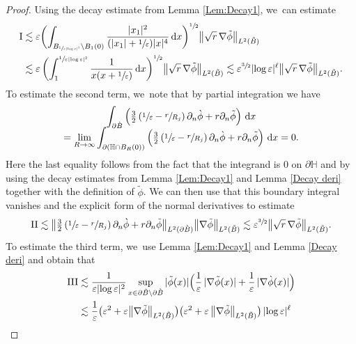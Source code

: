 \documentclass[10pt]{amsart}
\let\epsilon\varepsilon
\let\backslash\setminus
\newcommand{\rI}{\mathrm{I}}
\newcommand{\rII}{\mathrm{II}}
\newcommand{\rIII}{\mathrm{III}}
\theoremstyle{definition}
\newcommand\bnorm[1]{\bigl\lVert #1\bigr\rVert}
\newcommand\eq{=}
\newcommand\dd{\,\mathrm{d}}
\newcommand\dx{\dd x}
\let\de\partial
\let\eps\epsilon
\let\mel\relax
\begin{document}
\begin{proof}
Using the decay estimate from Lemma \ref{Lem:Decay1}, we~can estimate\vspace*{-3pt}
\begin{align*}
\mel \rI&\lesssim \eps\biggl(\int_{B_{\sfrac{1}{\eps|{\log\eps}|^2}}\backslash B_1(0)}\frac{|x_1|^2}{(|x_1|+\sfrac{1}{\eps})|x|^4}\dx \biggr)^{\sfrac{1}{2}}\bnorm{\sqrt{r}\,\nabla\tilde{\phi}}_{L^2(\tilde{B})}\\
&\lesssim \eps\, \biggl(\int_{1}^{\sfrac{1}{\eps|{\log\eps}|^2}}
\frac{1}{x(x+\sfrac{1}{\eps})}\dx\biggr)^{\sfrac{1}{2}}
\bnorm{\sqrt{r}\,\nabla\tilde{\phi}}_{L^2(\tilde{B})}\lesssim \eps^{\sfrac{3}{2}}
|{\log\eps}|^\ell\bnorm{\sqrt{r}\,\nabla\tilde{\phi}}_{L^2(\tilde{B})}.
\end{align*}
To estimate the second term, we~note that by partial integration we have\vspace*{-5pt}
\begin{multline*}
\int_{\de\grave{B}}\left(\tfrac{3}{2}\left(\sfrac{1}{\eps}-\sfrac{r}{R_j}\right)\de_n\grave{\phi}+r\de_n\tilde{\phi}\right)\dx\\[-5pt]
\eq \lim_{R\to \infty}\int_{\de \left(\mathbb{H}\cap B_R(0)\right)}\left(\tfrac{3}{2}\left(\sfrac{1}{\eps}-\sfrac{r}{R_j}\right)\de_n\grave{\phi}+r\de_n\tilde{\phi}\right)\dx\eq0.
\end{multline*}
Here the last equality follows from the fact that the integrand is $0$ on $\de\mathbb{H}$ and by using the decay estimates from Lemma \ref{Lem:Decay1} and Lemma \ref{Decay deri} together with the definition of $\tilde{\phi}$.
We can then use that this boundary integral vanishes and the explicit form of the normal derivatives to estimate\vspace*{-3pt}
\begin{align*}
\rII\lesssim \bnorm{\tfrac{3}{2}\left(\sfrac{1}{\eps}-\sfrac{r}{R_j}\right)\de_n\grave{\phi}+r\de_n\tilde{\phi}}_{L^2(\de\grave{B})}\bnorm{\nabla\tilde{\phi}}_{L^2(\tilde{B})}\lesssim \eps^{\sfrac{3}{2}}\bnorm{\sqrt{r}\,\nabla\tilde{\phi}}_{L^2(\tilde{B})}.
\end{align*}
To estimate the third term, we~use Lemma \ref{Lem:Decay1} and Lemma \ref{Decay deri} and obtain that\vspace*{-3pt}
\begin{align*}
\mel \rIII&\lesssim \frac{1}{\eps|{\log\eps}|^2}\sup_{x\in \de\tilde{B}\backslash\de\grave{B}}|\tilde{\phi}(x)|\Bigl(\frac{1}{\eps}\,|\nabla\tilde{\phi}(x)|+\frac{1}{\eps}\,|\nabla\grave{\phi}(x)|\Bigr)\\
&\lesssim\frac{1}{\eps} \bigl(\eps^2+\eps\bnorm{\nabla\tilde{\phi}}_{L^2(\tilde{B})}\bigl)\bigl(\eps^2+\eps\,\bnorm{\nabla\tilde{\phi}}_{L^2(\tilde{B})}\bigr)\,|{\log\eps}|^\ell\\

\end{align*}
\end{proof}
\end{document}
